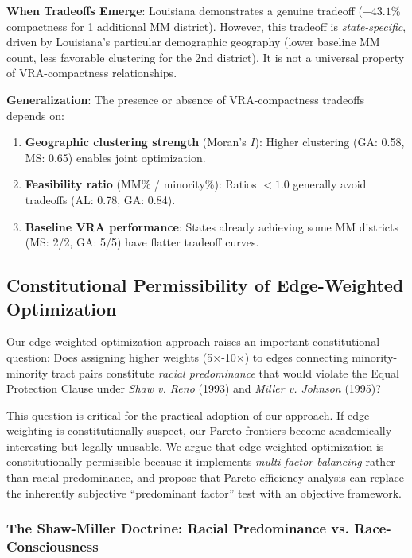 \textbf{When Tradeoffs Emerge}: Louisiana demonstrates a genuine tradeoff ($-43.1$\% compactness for 1 additional MM district). However, this tradeoff is \emph{state-specific}, driven by Louisiana's particular demographic geography (lower baseline MM count, less favorable clustering for the 2nd district). It is not a universal property of VRA-compactness relationships.

\textbf{Generalization}: The presence or absence of VRA-compactness tradeoffs depends on:
\begin{enumerate}
    \item \textbf{Geographic clustering strength} (Moran's $I$): Higher clustering (GA: 0.58, MS: 0.65) enables joint optimization.
    \item \textbf{Feasibility ratio} (MM\% / minority\%): Ratios $<1.0$ generally avoid tradeoffs (AL: 0.78, GA: 0.84).
    \item \textbf{Baseline VRA performance}: States already achieving some MM districts (MS: 2/2, GA: 5/5) have flatter tradeoff curves.
\end{enumerate}

\subsection{Constitutional Permissibility of Edge-Weighted Optimization}

Our edge-weighted optimization approach raises an important constitutional question: Does assigning higher weights (5$\times$-10$\times$) to edges connecting minority-minority tract pairs constitute \emph{racial predominance} that would violate the Equal Protection Clause under \emph{Shaw v. Reno} (1993) and \emph{Miller v. Johnson} (1995)?

This question is critical for the practical adoption of our approach. If edge-weighting is constitutionally suspect, our Pareto frontiers become academically interesting but legally unusable. We argue that edge-weighted optimization is constitutionally permissible because it implements \emph{multi-factor balancing} rather than racial predominance, and propose that Pareto efficiency analysis can replace the inherently subjective ``predominant factor'' test with an objective framework.

\subsubsection{The Shaw-Miller Doctrine: Racial Predominance vs. Race-Consciousness}

